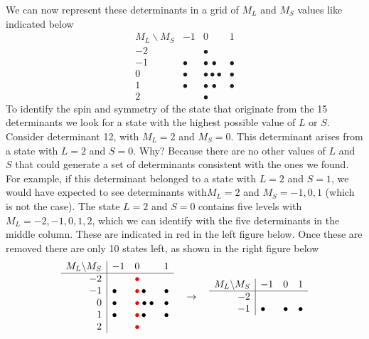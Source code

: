 \documentclass[../Main/chem532-notes.tex]{subfiles}
\begin{document}
\begin{example}
We can now represent these determinants in a grid of $M_L$ and $M_S$ values like indicated below
\begin{equation}
   \begin{array}{r|lll}
    M_L \backslash M_S & -1 & 0 & 1 \\
    \hline
-2 & & \bullet &  \\
-1 & \bullet  &\bullet \, \bullet& \bullet \\
0 & \bullet &\bullet\bullet\bullet& \bullet\\
1 & \bullet &\bullet \, \bullet& \bullet\\
2 & &\bullet&
\end{array}
\end{equation}
To identify the spin and symmetry of the state that originate from the 15 determinants we look for a state with the highest possible value of $L$ or $S$.
Consider determinant 12, with $M_L = 2$ and $M_S = 0$. This determinant arises from a state with $L=2$ and $S=0$. Why? Because there are no other values of $L$ and $S$ that could generate a set of determinants consistent with the ones we found. For example, if this determinant belonged to a state with $L=2$ and $S=1$, we would have expected to see determinants with$M_L = 2$ and $M_S = -1,0,1$ (which is not the case).
The state $L=2$ and $S=0$ contains five levels with $M_L = -2,-1,0,1,2$, which we can identify with the five determinants in the middle column. These are indicated in red in the left figure below. Once these are removed there are only 10 states left, as shown in the right figure below
\begin{equation*}
   \begin{array}{r|lll}
    M_L \backslash M_S & -1 & 0 & 1 \\
    \hline
-2 & & \color{red}{\bullet} &  \\
-1 & \bullet  &{\color{red}\bullet} \, \bullet& \bullet \\
0 & \bullet &{\color{red}\bullet} \bullet\bullet& \bullet\\
1 & \bullet &{\color{red}\bullet} \, \bullet& \bullet\\
2 & &{\color{red}\bullet}&
\end{array}
\quad \rightarrow \quad 
   \begin{array}{r|lll}
    M_L \backslash M_S & -1 & 0 & 1 \\
    \hline
-2 & &  &  \\
-1 & \bullet  & \bullet& \bullet \\

\end{array}
\end{equation*}
\end{example}
\end{document}
